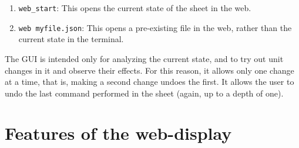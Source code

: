\documentclass{article}
\begin{document}
\begin{enumerate}
    \begin{enumerate}
        \item \texttt{web\_start}: This opens the current state of the sheet in the web.
        \item \texttt{web myfile.json}: This opens a pre-existing file in the web, rather than the current state in the terminal.
    \end{enumerate}
    The GUI is intended only for analyzing the current state, and to try out unit changes in it and observe their effects. For this reason, it allows only one change at a time, that is, making a second change undoes the first. It allows the user to undo the last command performed in the sheet (again, up to a depth of one).
\end{enumerate}

\section{Features of the web-display}
\end{document}
